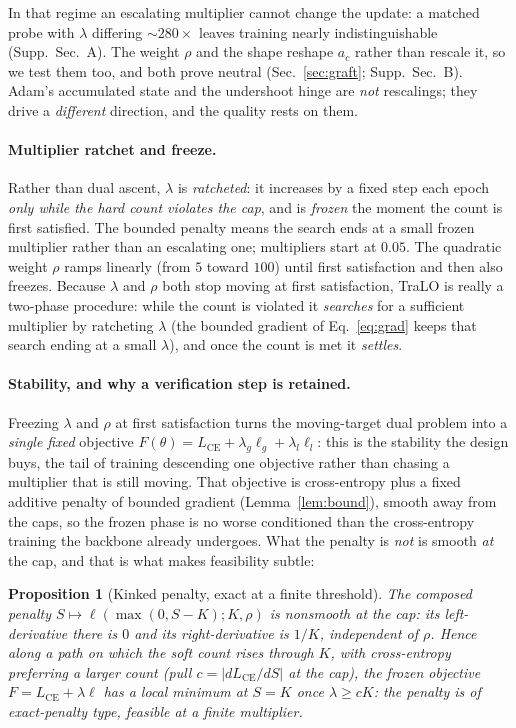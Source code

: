 \documentclass[letterpaper]{article} %
\newtheorem{proposition}{Proposition}  %
\begin{document}
\noindent In that regime an escalating multiplier cannot change the update: a matched probe
with $\lambda$ differing ${\sim}280\times$ leaves training nearly indistinguishable
(Supp.~Sec.~A). The weight $\rho$ and the shape reshape $a_c$ rather than rescale it, so we
test them too, and both prove neutral (Sec.~\ref{sec:graft}; Supp.~Sec.~B). Adam's
accumulated state and the undershoot hinge are \emph{not} rescalings; they drive a
\emph{different} direction, and the quality rests on them.

\paragraph{Multiplier ratchet and freeze.}
Rather than dual ascent, $\lambda$ is \emph{ratcheted}: it increases by a fixed step
each epoch \emph{only while the hard count violates the cap}, and is \emph{frozen} the
moment the count is first satisfied. The bounded penalty means the search ends at a small
frozen multiplier rather than an escalating one; multipliers start at $0.05$. The
quadratic weight $\rho$ ramps linearly (from $5$ toward $100$) until first
satisfaction and then also freezes. Because $\lambda$ and $\rho$ both stop moving at
first satisfaction, TraLO is really a two-phase procedure: while the count is violated it
\emph{searches} for a sufficient multiplier by ratcheting $\lambda$ (the bounded gradient
of Eq.~\eqref{eq:grad} keeps that search ending at a small $\lambda$), and once the count
is met it \emph{settles}.

\paragraph{Stability, and why a verification step is retained.}
Freezing $\lambda$ and $\rho$ at first satisfaction turns the moving-target dual problem into
a \emph{single fixed} objective $F(\theta)=L_{\text{CE}}+\lambda_g\ell_g+\lambda_l\ell_l$:
this is the stability the design buys, the tail of training descending one objective rather
than chasing a multiplier that is still moving. That objective is cross-entropy plus a fixed
additive penalty of bounded gradient (Lemma~\ref{lem:bound}), smooth away from the caps, so
the frozen phase is no worse conditioned than the cross-entropy training the backbone already
undergoes. What the penalty is \emph{not} is smooth \emph{at} the cap, and that is what makes
feasibility subtle:

\begin{proposition}[Kinked penalty, exact at a finite threshold]
\label{prop:exact}
The composed penalty $S\mapsto\ell(\max(0,S{-}K);K,\rho)$ is nonsmooth at the cap: its
left-derivative there is $0$ and its right-derivative is $1/K$, independent of $\rho$. Hence
along a path on which the soft count rises through $K$, with cross-entropy preferring a larger
count (pull $c=\lvert dL_{\text{CE}}/dS\rvert$ at the cap), the frozen objective
$F=L_{\text{CE}}+\lambda\ell$ has a local minimum \emph{at} $S{=}K$ once $\lambda\ge cK$: the
penalty is of exact-penalty type, feasible at a finite multiplier.
\end{proposition}
\end{document}
